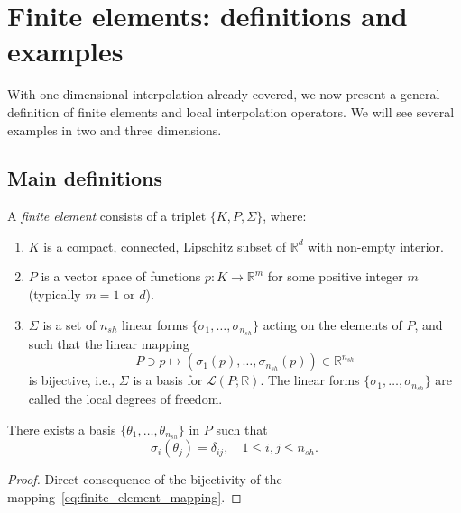 \section{Finite elements: definitions and examples}\label{sec:finite-element-definitions}
With one-dimensional interpolation already covered, we now present a general definition of finite elements and local interpolation operators. We will see several examples in two and three dimensions. 

\subsection{Main definitions}
\begin{definition}\label{def:finiteelements}
    A \emph{finite element} consists of a triplet $\{K, P, \Sigma\}$, where:
    \begin{enumerate}
        \item $K$ is a compact, connected, Lipschitz subset of $\mathbb{R}^d$ with non-empty interior.
        \item $P$ is a vector space of functions $p: K \rightarrow \mathbb{R}^m$ for some positive integer $m$ (typically $m = 1$ or $d$).
        \item $\Sigma$ is a set of $n_{sh}$ linear forms $\{\sigma_1, \dots, \sigma_{n_{sh}}\}$ acting on the elements of $P$, and such that the linear mapping
        \begin{equation}\label{eq:finite_element_mapping}
            P \ni p \mapsto (\sigma_1(p), \dots, \sigma_{n_{sh}}(p)) \in \mathbb{R}^{n_{sh}}
        \end{equation}
        is bijective, i.e., $\Sigma$ is a basis for $\mathcal{L}(P; \mathbb{R})$. The linear forms $\{\sigma_1, \dots, \sigma_{n_{sh}}\}$ are called the local degrees of freedom.
    \end{enumerate}
\end{definition}

\begin{lemma}\label{lemma:basis_from_bijectivity}
    There exists a basis $\{\theta_1, \dots, \theta_{n_{sh}}\}$ in $P$ such that
    \begin{equation}
        \sigma_i(\theta_j) = \delta_{ij}, \quad 1 \le i,j \le n_{sh}.
    \end{equation}
    \begin{proof}
        Direct consequence of the bijectivity of the mapping~\eqref{eq:finite_element_mapping}.
    \end{proof}
\end{lemma}

